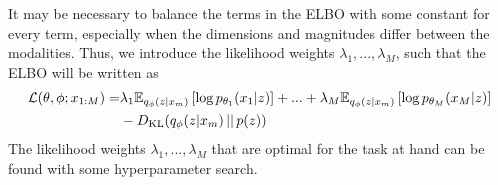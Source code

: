 It may be necessary to balance the terms in the ELBO with some constant for every term, especially when the dimensions and magnitudes differ between the modalities. Thus, we introduce the likelihood weights $\lambda_1, ..., \lambda_M$, such that the ELBO will be written as 
\begin{align*}
    \begin{split}
        \mathcal{L}(\theta, \phi; x_{1:M}) = & \lambda_1 \mathbb{E}_{q_{\phi}(z | x_m)}\left[ \log p_{{\theta}_1}(x_1 |  z) \right] + ... + \lambda_M \mathbb{E}_{q_{\phi}(z | x_m)}\left[ \log p_{{\theta}_M}(x_M |  z) \right] \\
        & - D_{\mathrm{KL}}(q_{\phi}(z | x_m) \,||\, p(z)) 
    \end{split}
\end{align*}
The likelihood weights $\lambda_1, ..., \lambda_M$ that are optimal for the task at hand can be found with some hyperparameter search.